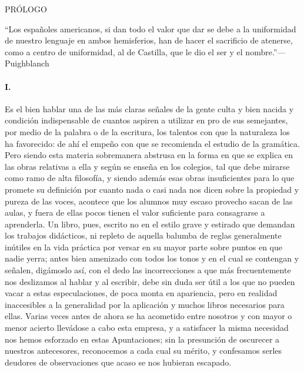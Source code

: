 \documentclass{article}
\begin{document}
PRÓLOGO

\small

\begin{flushright}

``Los españoles americanos, si dan todo el valor que dar 
se debe a la uniformidad de nuestro lenguaje en ambos 
hemisferios, han de hacer el sacrificio de atenerse, como 
a centro de uniformidad, al de Castilla, que le dio el ser 
y el nombre.''---Puighblanch

\end{flushright}

\normalsize

\paragraph{I.}

Es el bien hablar una de las más claras señales de la gente culta y bien nacida y condición 
indispensable de cuantos aspiren a utilizar en pro de sus semejantes, por medio de la palabra o 
de la escritura, los talentos con que la naturaleza los ha favorecido: de ahí el empeño con que 
se recomienda el estudio de la gramática. Pero siendo esta materia sobremanera abstrusa en la 
forma en que se explica en las obras relativas a ella y según se enseña en los colegios, tal 
que debe mirarse como ramo de alta filosofía, y siendo además esas obras insuficientes para lo 
que promete su definición por cuanto nada o casi nada nos dicen sobre la propiedad y pureza de 
las voces, acontece que los alumnos muy escaso provecho sacan de las aulas, y fuera de ellas 
pocos tienen el valor suficiente para consagrarse a aprenderla. Un libro, pues, escrito no en 
el estilo grave y estirado que demandan los trabajos didácticos, ni repleto de aquella balumba 
de reglas generalmente inútiles en la vida práctica por versar en su mayor parte sobre puntos 
en que nadie yerra; antes bien amenizado con todos los tonos y en el cual se contengan y 
señalen, digámoslo así, con el dedo las incorrecciones a que más frecuentemente nos deslizamos 
al hablar y al escribir, debe sin duda ser útil a los que no pueden vacar a estas 
especulaciones, de poca monta en apariencia, pero en realidad inaccesibles a la generalidad por 
la aplicación y muchos libros necesarios para ellas. Varias veces antes de ahora se ha 
acometido entre nosotros y con mayor o menor acierto llevádose a cabo esta empresa, y a 
satisfacer la misma necesidad nos hemos esforzado en estas Apuntaciones; sin la presunción de 
oscurecer a nuestros antecesores, reconocemos a cada cual su mérito, y confesamos serles 
deudores de observaciones que acaso se nos hubieran escapado.
\end{document}
